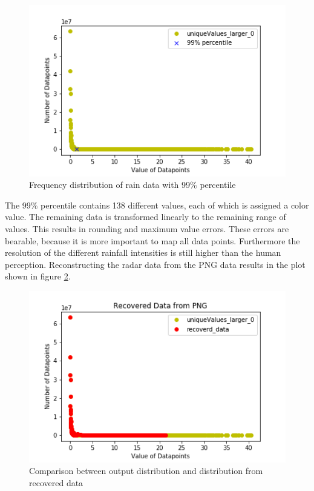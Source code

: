 \documentclass[oneside]{htwg-report}
\begin{document}
\begin{figure}[ht]
    \centering
    \includegraphics[width=0.8\linewidth,angle=0]{../abb/Radardatapoints_of_June_2016_larger0_99percentile.png}
    \caption[Datenaufbereitung]{Frequency distribution of rain data with 99\% percentile}
    \label{fig:Radardatapoints_of_June_2016_larger0_99percentile}
\end{figure}
\begin{sloppypar}
The 99\% percentile contains 138 different values, each of which is assigned a color value.
The remaining data is transformed linearly to the remaining range of values.
This results in rounding and maximum value errors. These errors are bearable, because it is more important to map all data points.
Furthermore the resolution of the different rainfall intensities is still higher than the human perception.
Reconstructing the radar data from the PNG data results in the plot shown in figure \ref{fig:Radardatapoints_of_June_2016_RecoveredData}.
\end{sloppypar}
\begin{figure}[ht]
    \centering
    \includegraphics[width=0.8\linewidth,angle=0]{../abb/Radardatapoints_of_June_2016_RecoveredData.png}
    \caption[Datenaufbereitung]{Comparison between output distribution and distribution from recovered data}
    \label{fig:Radardatapoints_of_June_2016_RecoveredData}
\end{figure}
\end{document}
